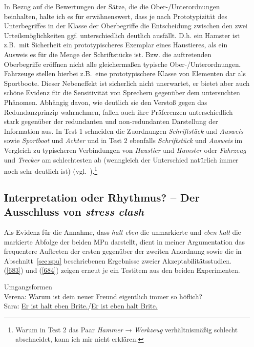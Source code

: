 In Bezug auf die Bewertungen der Sätze, die die Ober-/Unterordnungen beinhalten, halte ich es für erwähnenswert, dass je nach Prototypizität  des Unterbegriffes in der Klasse der Oberbegriffe die Entscheidung zwischen den zwei Urteilsmöglichkeiten ggf. unterschiedlich deutlich ausfällt. D.h. ein Hamster ist z.B.\ mit Sicherheit ein prototypischeres Exemplar eines Haustieres, als ein Ausweis es für die Menge der Schriftstücke ist. Bzw. die auftretenden Oberbegriffe eröffnen nicht alle gleichermaßen typische Ober-/Unterordnungen. Fahr\-zeuge stellen hierbei z.B.\ eine prototypischere Klasse von Elementen dar als Sportboote. Dieser Nebeneffekt ist sicherlich nicht unerwartet, er bietet aber auch schöne Evidenz für die Sensitivität von Sprechern gegenüber dem untersuchten Phänomen. Abhängig davon, wie deutlich sie den Verstoß gegen das Redundanzprinzip wahr\-nehmen, fallen auch ihre Präferenzen unterschiedlich stark ge\-genüber der redundanten und non-redundanten Darstellung der Information aus. In Test 1 schneiden die Zuordnungen \textit{Schriftstück} und \textit{Ausweis} sowie \textit{Sportboot} und \textit{Achter} und in Test 2 ebenfalls \textit{Schriftstück} und \textit{Ausweis} im Vergleich zu ty\-pischeren Verbindungen von \textit{Haustier} und \textit{Hamster} oder \textit{Fahrzeug} und \textit{Trecker} am schlech\-testen ab (wenn\-gleich der Unterschied natürlich immer noch sehr deutlich ist) (vgl.\ ).\footnote{Warum in Test 2 das Paar \textit{Hammer} → \textit{Werkzeug} verhältnismäßig schlecht abschneidet, kann ich mir nicht erklären.}

\subsection{Interpretation oder Rhythmus? -- Der Ausschluss von \textit{stress clash}}
\label{sec:stressclash}
Als Evidenz für die Annahme, dass \textit{halt eben} die unmarkierte und \textit{eben halt} die markierte Abfolge der beiden MPn darstellt, dient in meiner Argumentation das frequentere Auftreten der ersten gegenüber der zweiten Anordnung sowie die in Abschnitt~\ref{sec:spu} beschriebenen Ergebnisse zweier Akzeptabilitätsstudien. (\ref{683}) und (\ref{684}) zeigen erneut je ein Testitem aus den beiden Experimenten.

\begin{exe}
	\ex\label{683} Umgangsformen\\
	Verena: Warum ist dein neuer Freund eigentlich immer so höflich?\\
	Sara: \ul{Er ist halt eben Brite.}/\ul{Er ist eben halt Brite.}
\end{exe}

